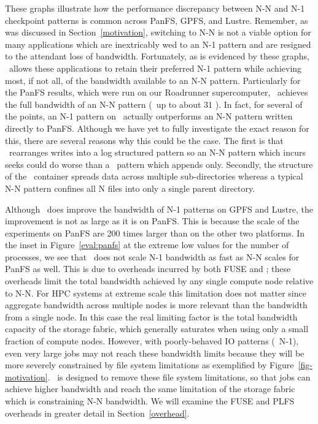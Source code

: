 These graphs illustrate how the performance discrepancy between N-N
and N-1 checkpoint patterns is common across PanFS, GPFS,
and Lustre. Remember, as was discussed in Section~\ref{motivation}, switching
to N-N is not a viable option for many applications which are inextricably wed
to an N-1 pattern and are resigned to the attendant loss of bandwidth.
Fortunately, as is evidenced by these graphs, \plfs\ allows these applications
to retain their preferred N-1 pattern while achieving most, if not all, of the
bandwidth available to an N-N pattern. Particularly for the PanFS results,
which were run on our Roadrunner supercomputer, \plfs\ achieves the full
bandwidth of an N-N pattern (\ie\ up to about 31 \GBs). In fact, for several
of the points, an N-1 pattern on \plfs\ actually outperforms an N-N pattern
written directly to PanFS. Although we have yet to fully investigate the exact
reason for this, there are several reasons why this could be the case. The
first is that \plfs\ rearranges writes into a log structured pattern so an N-N
pattern which incurs seeks could do worse than a \plfs\ pattern which appends
only. Secondly, the structure of the \plfs\ container spreads data across
multiple sub-directories whereas a typical N-N
pattern confines all N files into only a single parent directory.

Although \plfs\ does improve the bandwidth of N-1 patterns on GPFS and Lustre,
the improvement is not as large as it is on PanFS. This is because the scale of
the experiments on PanFS are 200 times larger than on the other two platforms.
In the inset in Figure~\ref{eval:panfs} at the extreme low values for the
number of processes, we see that \plfs\ does not scale N-1 bandwidth as fast as
N-N scales for PanFS as well. This is due to overheads incurred by both FUSE
and \plfs; these overheads limit the total bandwidth achieved by any single
compute node relative to N-N. For HPC systems at extreme scale this limitation
does not matter since aggregate bandwidth across multiple nodes is more
relevant than the bandwidth from a single node. In this case the real limiting
factor is the total bandwidth capacity of the storage fabric, which generally
saturates when using only a small fraction of compute nodes.  However, with
poorly-behaved IO patterns (\ie\ N-1), even very large jobs may not reach these
bandwidth limits because they will be more severely constrained by file system
limitations as exemplified by Figure~\ref{fig-motivation}. \plfs\ is designed
to remove these file system limitations, so that jobs can achieve higher
bandwidth and reach the same limitation of the storage fabric which is
constraining N-N bandwidth.  We will examine the FUSE and PLFS overheads in
greater detail in Section~\ref{overhead}. 
 
